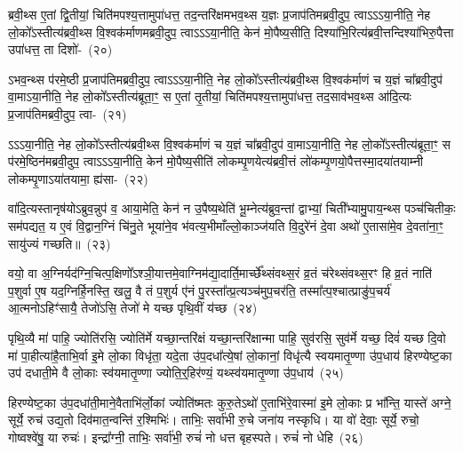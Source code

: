 ब्रवी॒थ्स ए॒तां द्वि॒तीयां॒ चिति॑मपश्य॒त्तामुपा॑धत्त॒ तद॒न्तरि॑क्षमभव॒थ्स य॒ज्ञः प्र॒जा\-प॑ति\-मब्रवी॒दुप॒ त्वा\-ऽऽ\-ऽया॒नीति॒ नेह लो॒को᳚\-ऽस्तीत्य॑ब्रवी॒थ्स वि॒श्वक॑र्माणमब्रवी॒दुप॒ त्वा\-ऽऽ\-ऽया॒नीति॒ केन॑ मो॒पैष्य॒सीति॒ दिश्या॑भि॒रित्य॑ब्रवी॒त्तन्दिश्या॑भिरु॒पैत्ता उपा॑धत्त॒ ता दिशो॑-~(२०)\ip

ऽभव॒न्थ्स प॑रमे॒ष्ठी प्र॒जा\-प॑ति\-मब्रवी॒दुप॒ त्वा\-ऽऽ\-ऽया॒नीति॒ नेह लो॒को᳚\-ऽस्तीत्य॑ब्रवी॒थ्स वि॒श्वक॑र्माणं च य॒ज्ञं चा᳚ब्रवी॒दुप॑ वा॒मा\-ऽया॒नीति॒ नेह लो॒को᳚\-ऽस्तीत्य॑ब्रूता॒ꣳ॒ स ए॒तां तृ॒तीयां॒ चिति॑मपश्य॒त्तामुपा॑धत्त॒ तद॒साव॑भव॒थ्स आ॑दि॒त्यः प्र॒जा\-प॑ति\-मब्रवी॒दुप॒ त्वा-~(२१)\ip

ऽऽ\-ऽया॒नीति॒ नेह लो॒को᳚\-ऽस्तीत्य॑ब्रवी॒थ्स वि॒श्वक॑र्माणं च य॒ज्ञं चा᳚ब्रवी॒दुप॑ वा॒मा\-ऽया॒नी\-ति॒ नेह लो॒को᳚\-ऽस्तीत्य॑ब्रूता॒ꣳ॒ स प॑रमे॒ष्ठिन॑मब्रवी॒दुप॒ त्वा\-ऽऽ\-ऽया॒नीति॒ केन॑ मो॒पैष्य॒सीति॑ लोकम्पृ॒णयेत्य॑ब्रवी॒त्तं लो॑कम्पृ॒णयो॒पैत्तस्मा॒दया॑तयाम्नी लोकम्पृ॒णा\-ऽया॑तयामा॒ ह्य॑सा-~(२२)\ip

वा॑दि॒त्यस्तानृष॑यो\-ऽब्रुव॒न्नुप॑ व॒ आया॒मेति॒ केन॑ न उ॒पैष्य॒थेति॑ भू॒म्नेत्य॑ब्रुव॒न्तां द्वाभ्यां॒ चिती᳚भ्यामु॒पाय॒न्थ्स पञ्च॑चितीकः॒ सम॑पद्यत॒ य ए॒वं वि॒द्वान॒ग्निं चि॑नु॒ते भूया॑ने॒व भ॑वत्य॒भीमाँल्लो॒काञ्ज॑यति वि॒दुरे॑नं दे॒वा अथो॑ ए॒तासा॑मे॒व दे॒वता॑ना॒ꣳ॒ सायु॑ज्यं गच्छति॥~(२३)\ip

{\anuvakamend[{तम॑सा\-ऽऽ\-दि॒त्यो᳚\-ऽस्तीति॒ दिश॑ आदि॒त्यः प्र॒जा\-प॑ति\-मब्रवी॒दुप॑ त्वा॒\-ऽसौ पञ्च॑चत्वारिꣳशच्च}]}

वयो॒ वा अ॒ग्निर्यद॑ग्नि॒चित्प॒क्षिणो᳚\-ऽश्ञी॒यात्तमे॒वाग्निम॑द्या॒दार्ति॒मार्च्छे᳚थ्संवथ्स॒रं व्र॒तं च॑रेथ्संवथ्स॒रꣳ हि व्र॒तं नाति॑ प॒शुर्वा ए॒ष यद॒ग्निर्\mbox{}हि॒नस्ति॒ खलु॒ वै तं प॒शुर्य ए॑नं पु॒रस्ता᳚त्प्र॒त्यञ्च॑मुप॒चर॑ति॒ तस्मा᳚त्प॒श्चात्प्राङु॑प॒चर्य॑ आ॒त्मनो\-ऽहिꣳ॑सायै॒ तेजो॑\-ऽसि॒ तेजो॑ मे यच्छ पृथि॒वीं य॑च्छ~(२४)\ip

पृथि॒व्यै मा॑ पाहि॒ ज्योति॑रसि॒ ज्योति॑र्मे यच्छा॒न्तरि॑क्षं यच्छा॒न्तरि॑क्षान्मा पाहि॒ सुव॑रसि॒ सुव॑र्मे यच्छ॒ दिवं॑ यच्छ दि॒वो मा॑ पा॒हीत्या॑है॒ताभि॒र्वा इ॒मे लो॒का विधृ॑ता॒ यदे॒ता उ॑प॒दधा᳚त्ये॒षां लो॒कानां॒ विधृ॑त्यै स्वयमा\-तृ॒ण्णा उ॑प॒धाय॑ हिरण्येष्ट॒का उप॑ दधाती॒मे वै लो॒काः स्व॑यमातृ॒ण्णा ज्योति॒र्॒\mbox{}हिर॑ण्यं॒ यथ्स्व॑यमातृ॒ण्णा उ॑प॒धाय॑~(२५)\ip

हिरण्येष्ट॒का उ॑प॒\-दधा॑ती॒माने॒वैताभि॑र्लो॒कां ज्योति॑ष्मतः कुरु॒ते\-ऽथो॑ ए॒ताभि॑रे॒वास्मा॑ इ॒मे लो॒काः प्र भा᳚न्ति॒ यास्ते॑ अग्ने॒ सूर्ये॒ रुच॑ उद्य॒तो दिव॑मात॒न्वन्ति॑ र॒श्मिभिः॑। ताभिः॒ सर्वा॑भी रु॒चे जना॑य नस्कृधि। या वो॑ देवाः॒ सूर्ये॒ रुचो॒ गोष्वश्वे॑षु॒ या रुचः॑। इन्द्रा᳚ग्नी॒ ताभिः॒ सर्वा॑भी॒ रुचं॑ नो धत्त बृहस्पते। रुचं॑ नो धेहि~(२६)\ip

